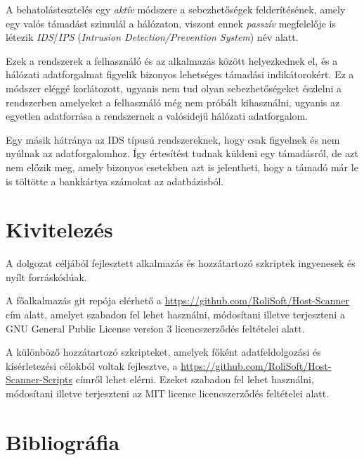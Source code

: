 \documentclass[a4paper,12pt]{article}
\begin{document}
	A behatolástesztelés egy \textit{aktív} módszere a sebezhetőségek felderítésének, amely egy valós támadást szimulál a hálózaton, viszont ennek \textit{passzív} megfelelője is létezik \textit{IDS}/\textit{IPS} (\textit{Intrusion Detection/Prevention System}) név alatt.
	
	Ezek a rendszerek a felhasználó és az alkalmazás között helyezkednek el, és a hálózati adatforgalmat figyelik bizonyos lehetséges támadási indikátorokért. Ez a módszer eléggé korlátozott, ugyanis nem tud olyan sebezhetőségeket észlelni a rendszerben amelyeket a felhasználó még nem próbált kihasználni, ugyanis az egyetlen adatforrása a rendszernek a valósidejű hálózati adatforgalom.
	
	Egy másik hátránya az IDS típusú rendszereknek, hogy csak figyelnek és nem nyúlnak az adatforgalomhoz. Így értesítést tudnak küldeni egy támadásról, de azt nem előzik meg, amely bizonyos esetekben azt is jelentheti, hogy a támadó már le is töltötte a bankkártya számokat az adatbázisból.

\section{Kivitelezés}

	A dolgozat céljából fejlesztett alkalmazás és hozzátartozó szkriptek ingyenesek és nyílt forráskódúak.

	A főalkalmazás git repója elérhető a \url{https://github.com/RoliSoft/Host-Scanner} cím alatt, amelyet szabadon fel lehet használni, módosítani illetve terjeszteni a GNU General Public License version 3\cite{gplv3} licencszerződés feltételei alatt.
	
	A különböző hozzátartozó szkripteket, amelyek főként adatfeldolgozási és kísérletezési célokból voltak fejlesztve, a \url{https://github.com/RoliSoft/Host-Scanner-Scripts} címről lehet elérni. Ezeket szabadon fel lehet használni, módosítani illetve terjeszteni az MIT license\cite{mit} licencszerződés feltételei alatt.

\newpage
\section{Bibliográfia}

	\begingroup
	\renewcommand{\section}[2]{}
	\renewcommand{\markboth}[2]{}
		
		
	\endgroup
\end{document}
